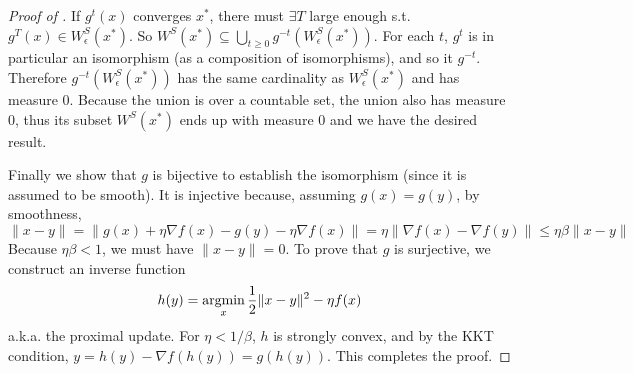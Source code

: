 \begin{example}
\begin{proof}[Proof of ]
If $g^t(x)$ converges $x^*$, there must $\exists T$ large enough s.t. $g^T(x)\in W_\epsilon^S(x^*)$. 
So $W^S(x^*)\subseteq \bigcup_{t\geq 0 }g^{-t}(W_\epsilon^S(x^*))$.
For each $t$, $g^t$ is in particular an isomorphism (as a composition of isomorphisms), and so it $g^{-t}$.
Therefore $g^{-t}(W_\epsilon^S(x^*))$ has the same cardinality as 
$W_\epsilon^S(x^*)$ and has measure 0. Because the union is over a countable set, the union also has measure 0, thus its subset $W^S(x^*)$ ends up with measure 0 and we have the desired result.

Finally we show that $g$ is bijective to establish the isomorphism (since it is assumed to be smooth). It is injective because, assuming $g(x) = g(y)$, by smoothness,
$$
\|x-y\| = \|g(x) + \eta\nabla f(x) - g(y) - \eta\nabla f(x) \|
 = \eta\|\nabla f(x) - \nabla f(y)\|\leq \eta\beta\|x-y\|
$$
Because $\eta\beta < 1$, we must have $\|x-y\|=0$.
To prove that $g$ is surjective, we construct an inverse function
$$h(y) = \mathop{\rm argmin}_x \frac{1}{2}\|x-y\|^2 - \eta f(x)$$
a.k.a. the proximal update. For $\eta < 1/\beta$, $h$ is strongly convex, and by the KKT condition,
$y = h(y) - \nabla f(h(y)) = g(h(y))$. This completes the proof.
\end{proof}

\end{example}
